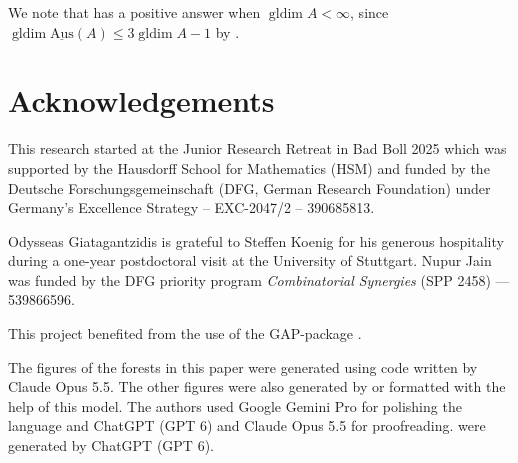 \documentclass[a4paper]{amsart}
\theoremstyle{definition}
\theoremstyle{remark}
\numberwithin{equation}{theorem}
\newcommand{\sAus}{\operatorname{\underline{Aus}}}
\newcommand{\gldim}{\operatorname{gldim}}
\newcommand{\FindStat}[1]{%
  \ifx&#1&%
  \url{www.findstat.org}%
  \else \url{www.findstat.org/#1}%
  \fi}%
\begin{document}
We note that  has a positive answer when $ \gldim A < \infty $, since $ \gldim \sAus(A) \leq 3 \gldim A - 1 $ by \cite[Proposition II.3.9]{AR}.

\section*{Acknowledgements}
This research started at the Junior Research Retreat in Bad Boll 2025 which was supported by the Hausdorff School for Mathematics (HSM) and funded by the Deutsche Forschungsgemeinschaft (DFG, German Research Foundation) under Germany's Excellence Strategy -- EXC-2047/2 -- 390685813.

Odysseas Giatagantzidis is grateful to Steffen Koenig for his generous hospitality during a one-year postdoctoral visit at the University of Stuttgart.
Nupur Jain was funded by the DFG priority program \emph{Combinatorial Synergies} (SPP 2458) --- 539866596.

This project benefited from the use of
the GAP-package \cite{QPA}.

The figures of the forests in this paper were generated using code written by Claude Opus 5.5. 
The other figures were also generated by or formatted with the help of this model.
The authors used Google Gemini Pro for polishing the language and ChatGPT (GPT 6) and Claude Opus 5.5 for proofreading. 
 were generated by ChatGPT (GPT 6).
\end{document}
